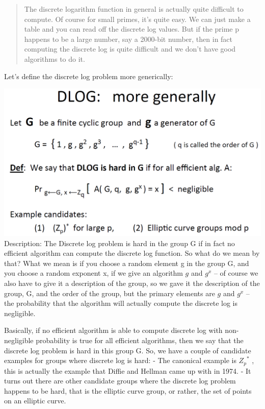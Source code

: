 \documentclass[11pt]{article}
\makeatletter
\def\maxwidth{\ifdim\Gin@nat@width>\linewidth\linewidth
    \else\Gin@nat@width\fi}
\let\Oldincludegraphics\includegraphics
\renewcommand{\includegraphics}[1]{\Oldincludegraphics[width=.8\maxwidth]{#1}}
\makeatother
\begin{document}
\begin{quote}
The discrete logarithm function in general is actually quite difficult
to compute. Of course for small primes, it's quite easy. We can just
make a table and you can read off the discrete log values. But if the
prime p happens to be a large number, say a 2000-bit number, then in
fact computing the discrete log is quite difficult and we don't have
good algorithms to do it.
\end{quote}

Let's define the discrete log problem more generically:

\includegraphics{./Images/NT-DLOG-Gen.png} Description: The Discrete log
problem is hard in the group G if in fact no efficient algorithm can
compute the discrete log function. So what do we mean by that? What we
mean is if you choose a random element g in the group G, and you choose
a random exponent x, if we give an algorithm \(g\) and \(g^{x}\) -- of
course we also have to give it a description of the group, so we gave it
the description of the group, G, and the order of the group, but the
primary elements are \(g\) and \(g^{x}\) -- the probability that the
algorithm will actually compute the discrete log is negligible.

Basically, if no efficient algorithm is able to compute discrete log
with non-negligible probability is true for all efficient algorithms,
then we say that the discrete log problem is hard in this group G. So,
we have a couple of candidate examples for groups where discrete log is
hard: - The canonical example is \({Z_{p}}^{*}\) , this is actually the
example that Diffie and Hellman came up with in 1974. - It turns out
there are other candidate groups where the discrete log problem happens
to be hard, that is the elliptic curve group, or rather, the set of
points on an elliptic curve.
\end{document}
